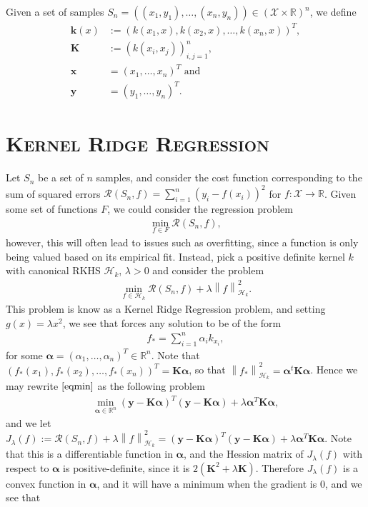 \documentclass[10pt,twoside,openany,final]{memoir}
\newcommand{\sssection}[1]{%
\section[#1]{\centering\normalfont\scshape \textbf{#1}}}
\theoremstyle{definition}
\theoremstyle{Break}
\newcommand{\lv}{\left\lVert}
\newcommand{\rv}{\right\rVert}
\newcommand{\R}{\mathbb{R}}
\renewcommand{\H}{\mathcal{H}}
\begin{document}
Given a set of samples $S_n=((x_1,y_1),\dots,(x_n,y_n)) \in (\mathcal{X} \times \R)^n$, we define 
\begin{align*}
	\textbf{k}(x)&:=(k(x_1,x),k(x_2,x),\dots,k(x_n,x))^T,\\
	\textbf{K}&:=(k(x_i,x_j))_{i,j=1}^n,\\
	\textbf{x}&=(x_1,\dots,x_n)^T \text{ and }\\
	\textbf{y}&= (y_{1},\dots,y_n)^T.
\end{align*}

\sssection{Kernel Ridge Regression}
Let $S_n$ be a set of $n$ samples, and consider the cost function corresponding to the sum of squared errors $\mathcal{R}(S_n,f) = \sum_{i=1}^n (y_i - f(x_i))^2$ for $f \colon \mathcal{X} \to \R$.
Given some set of functions $F$, we could consider the regression problem
\begin{align*}
	\min_{f \in F} \mathcal{R}(S_n,f),
\end{align*}
however, this will often lead to issues such as overfitting, since a function is only being valued based on its empirical fit. Instead, pick a positive definite kernel $k$ with canonical RKHS $\H_k$, $\lambda >0$ and consider the problem
\begin{align}
	\min_{f \in \H_k} \mathcal{R}(S_n,f) + \lambda \lv f\rv_{\H_k}^2. \label{eqmin}
\end{align}
This problem is know as a Kernel Ridge Regression problem, and setting $g(x)= \lambda x^2$, we see that  forces any solution to be of the form
\begin{align*}
	f_* = \sum_{i=1}^n \alpha_i k_{x_i},
\end{align*}
for some $\pmb \alpha=(\alpha_1,\dots,\alpha_n)^T \in \R^n$. Note that $(f_*(x_1),f_*(x_2),\dots,f_*(x_n))^T=\textbf{K} \pmb \alpha$, so that $\lv f_*\rv_{\H_k}^2 = \pmb \alpha^t \textbf{K} \pmb \alpha$. Hence we may rewrite $\ref{eqmin}$ as the following problem
\begin{align*}
	\min_{\pmb \alpha \in \R^n} (\textbf{y} - \textbf{K}\pmb \alpha)^T(\textbf{y}-\textbf{K} \pmb \alpha) + \lambda \pmb \alpha^T \textbf{K}\pmb \alpha,
\end{align*}
and we let $J_\lambda (f):=\mathcal{R}(S_n,f)+\lambda \lv f \rv_{\H_k}^2 = (\textbf{y} - \textbf{K}\pmb \alpha)^T(\textbf{y}-\textbf{K} \pmb \alpha) + \lambda \pmb \alpha^T \textbf{K}\pmb \alpha$. Note that this is a differentiable function in $\pmb \alpha$, and the Hession matrix of $J_\lambda(f)$ with respect to $\pmb \alpha$ is positive-definite, since it is $2(\textbf{K}^2 + \lambda \textbf{K})$. Therefore $J_\lambda(f)$ is a convex function in $\pmb \alpha$, and it will have a minimum when the gradient is $0$, and we see that
\end{document}

